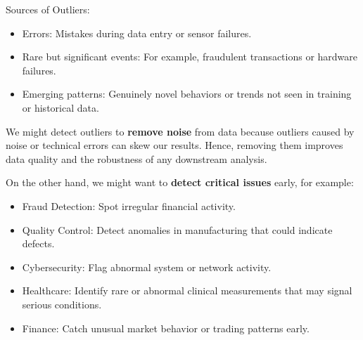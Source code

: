 \documentclass{article}
\begin{document}
Sources of Outliers:
\begin{itemize}
    \item Errors: Mistakes during data entry or sensor failures.
    \item Rare but significant events: For example, fraudulent transactions or hardware failures.
    \item Emerging patterns: Genuinely novel behaviors or trends not seen in training or historical data.
\end{itemize}

We might detect outliers to \textbf{remove noise} from data because outliers caused by noise or technical errors can skew our results. Hence, removing them improves data quality and the robustness of any downstream analysis.

On the other hand, we might want to \textbf{detect critical issues} early, for example:
\begin{itemize}
    \item Fraud Detection: Spot irregular financial activity.
    \item Quality Control: Detect anomalies in manufacturing that could indicate defects.
    \item Cybersecurity: Flag abnormal system or network activity.
    \item Healthcare: Identify rare or abnormal clinical measurements that may signal serious conditions.
    \item Finance: Catch unusual market behavior or trading patterns early.
\end{itemize}





\end{document}
